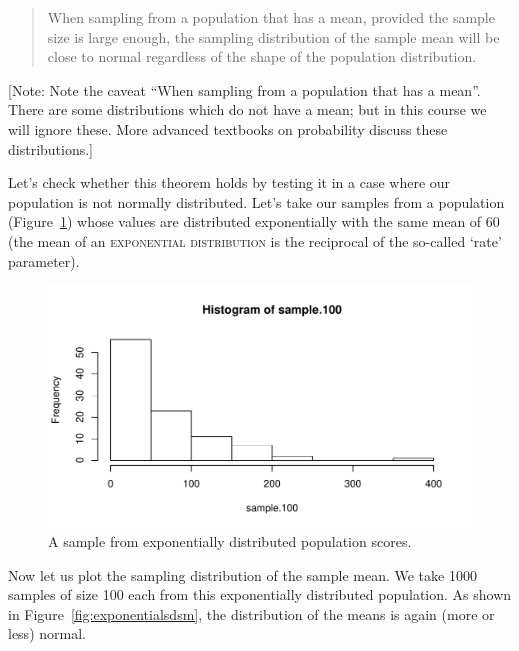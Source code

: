 \documentclass[12pt]{book}\usepackage[]{graphicx}\usepackage[]{color}
\makeatletter
\def\maxwidth{ %
  \ifdim\Gin@nat@width>\linewidth
    \linewidth
  \else
    \Gin@nat@width
  \fi
}
\newenvironment{knitrout}{}{} %
\makeatother
\begin{document}
\begin{quote}
When sampling from a population that has a mean,	
  provided the sample size is large enough, the sampling distribution
  of the sample mean will be close to normal regardless of the shape of the population distribution.
\end{quote}

[Note: Note the caveat ``When sampling from a population that has a mean''. There are some distributions which do not have a mean; but in this course we will ignore these. More advanced textbooks on probability discuss these distributions.]

Let's check whether this theorem holds
by testing it in a case where our population is not normally distributed.
Let's take our samples from
a population (Figure~\ref{fig:exppopulation}) whose values are distributed exponentially with the same
mean of 60 (the mean of an \textsc{exponential distribution} is the reciprocal of the so-called `rate' parameter).




\begin{figure}[!htbp]
  \centering
\begin{knitrout}
\color{fgcolor}
\includegraphics[width=\maxwidth]{figure/unnamed-chunk-21-1} 

\end{knitrout}
  \caption{A sample from exponentially distributed population scores.}
  \label{fig:exppopulation}
\end{figure}

Now let us plot the sampling distribution of the sample mean. We take
1000 samples of size 100 each from this exponentially distributed
population.
As shown in Figure~\ref{fig:exponentialsdsm}, the distribution of the means is again (more or less) normal.
\end{document}
